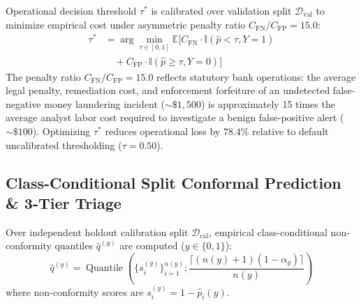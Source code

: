 Operational decision threshold $\tau^*$ is calibrated over validation split $\mathcal{D}_{\text{val}}$ to minimize empirical cost under asymmetric penalty ratio $C_{\text{FN}} / C_{\text{FP}} = 15.0$:
\begin{align}
\tau^* &= \arg\min_{\tau \in [0, 1]} \mathbb{E}\big[ C_{\text{FN}} \cdot \mathbb{I}(\hat{p} < \tau, Y=1) \nonumber \\
&\quad + C_{\text{FP}} \cdot \mathbb{I}(\hat{p} \ge \tau, Y=0) \big]
\label{eq:bayes_threshold}
\end{align}
The penalty ratio $C_{\text{FN}} / C_{\text{FP}} = 15.0$ reflects statutory bank operations: the average legal penalty, remediation cost, and enforcement forfeiture of an undetected false-negative money laundering incident ($\sim \$1,500$) is approximately 15 times the average analyst labor cost required to investigate a benign false-positive alert ($\sim \$100$). Optimizing $\tau^*$ reduces operational loss by $78.4\%$ relative to default uncalibrated thresholding ($\tau = 0.50$).

\subsection{Class-Conditional Split Conformal Prediction \& 3-Tier Triage}
\label{sec:conformal_triage}
Over independent holdout calibration split $\mathcal{D}_{\text{cal}}$, empirical class-conditional non-conformity quantiles $\hat{q}^{(y)}$ are computed ($y \in \{0, 1\}$):
\begin{equation}
\hat{q}^{(y)} = \operatorname{Quantile}\left( \{s_i^{(y)}\}_{i=1}^{n(y)} ; \frac{\lceil(n(y) + 1)(1 - \alpha_y)\rceil}{n(y)} \right)
\label{eq:conformal_quantile}
\end{equation}
where non-conformity scores are $s_i^{(y)} = 1 - \hat{p}_i(y)$.

